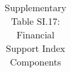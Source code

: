 \begin{longtable}{llcccccccccc}
\caption{Supplementary Table SI.17: Financial Support Index Components} \label{tab:pap__c2_2} \\                                                                                                                                                                                                                                                                                                                                                                                                                                                                                                                                                                                                                                                                                                                                                                                          
\hline \hline                                                                                                                                                                                                                                                                                                                                                                                                                                                                                                                                                                                                                                                                                                                                                                                                                                                                             

\end{longtable}
